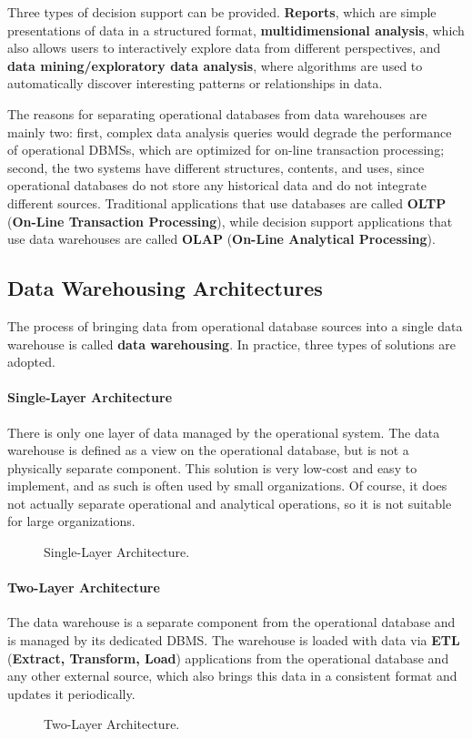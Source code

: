 Three types of decision support can be provided. \textbf{Reports}, which are simple presentations of data in a structured format, \textbf{multidimensional analysis}, which also allows users to interactively explore data from different perspectives, and \textbf{data mining/exploratory data analysis}, where algorithms are used to automatically discover interesting patterns or relationships in data.

The reasons for separating operational databases from data warehouses are mainly two: first, complex data analysis queries would degrade the performance of operational DBMSs, which are optimized for on-line transaction processing; second, the two systems have different structures, contents, and uses, since operational databases do not store any historical data and do not integrate different sources. Traditional applications that use databases are called \textbf{OLTP} (\textbf{On-Line Transaction Processing}), while decision support applications that use data warehouses are called \textbf{OLAP} (\textbf{On-Line Analytical Processing}).

\subsection{Data Warehousing Architectures}

The process of bringing data from operational database sources into a single data warehouse is called \textbf{data warehousing}. In practice, three types of solutions are adopted.
\paragraph{Single-Layer Architecture} There is only one layer of data managed by the operational system. The data warehouse is defined as a view on the operational database, but is not a physically separate component. This solution is very low-cost and easy to implement, and as such is often used by small organizations. Of course, it does not actually separate operational and analytical operations, so it is not suitable for large organizations.
\begin{figure}[h]
    \centering
    
    \caption{Single-Layer Architecture.}
\end{figure}

\paragraph{Two-Layer Architecture} The data warehouse is a separate component from the operational database and is managed by its dedicated DBMS. The warehouse is loaded with data via \textbf{ETL} (\textbf{Extract, Transform, Load}) applications from the operational database and any other external source, which also brings this data in a consistent format and updates it periodically.
\begin{figure}[h]
    \centering
    
    \caption{Two-Layer Architecture.}
\end{figure}

